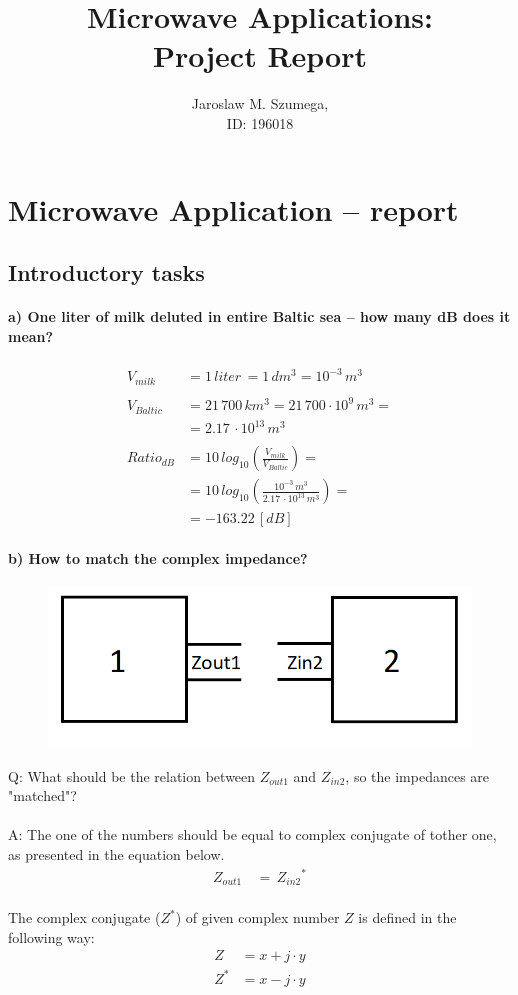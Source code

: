 \documentclass[a4paper, 11pt]{report}
\title{Microwave Applications:\\Project Report}
\author{Jaroslaw M. Szumega, \\ID: 196018 \date{}}
\begin{document}
\maketitle
\tableofcontents
\chapter{Microwave Application -- report}
\section{Introductory tasks}
\subsubsection{a) One liter of milk deluted in entire Baltic sea -- how many dB does it mean?}
\begin{align*}
V_{milk} &= 1\, liter\, = 1\, dm^3 = 10^{-3}\, m^3 \\
\\
V_{Baltic} &= 21\, 700\, km^3 = 21\, 700 \cdot 10^9\, m^3 =\\ 
		   &= 2.17\, \cdot 10^{13}\, m^3 \\
		   \\
Ratio_{dB} &= 10\, log_{10}\left(\frac{V_{milk}}{V_{Baltic}}\right) = \\
		   &= 10\, log_{10}\left(\frac{10^{-3}\, m^3}{2.17\, \cdot 10^{13}\, m^3}\right) = \\
		   &= -163.22\, [dB]
\end{align*}

\subsubsection{b) How to match the complex impedance?}

\begin{figure}[h]
	\centering
	\includegraphics[width=0.3\linewidth]{matching}
	\label{fig:matching}
\end{figure}
\noindent
Q: What should be the relation between $Z_{out1}$ and $Z_{in2}$, so the impedances are "matched"?
\\
\\
A: The one of the numbers should be equal to complex conjugate of tother one, as presented in the equation below.
\begin{align*}
Z_{out1}\, &= \, {Z_{in2}}^*
\end{align*}
\\
The complex conjugate ($Z^*$) of given complex number $Z$ is defined in the following way:
\begin{align*}
Z &= x + j\cdot y \\
Z^* &= x - j\cdot y \\
\end{align*}
\newpage
\end{document}
